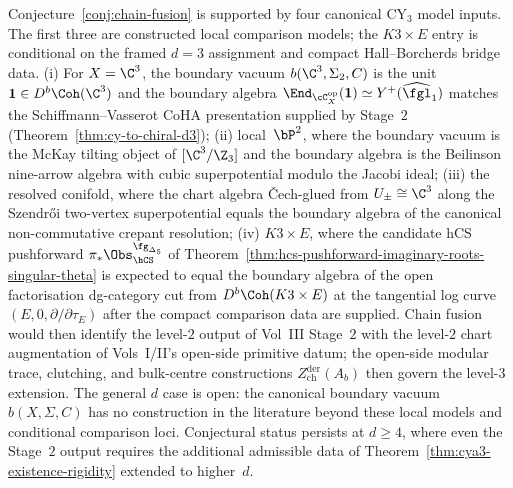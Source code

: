 \begin{remark}
\label{rem:chain-fusion-verified-cases}
Conjecture~\ref{conj:chain-fusion} is supported by four canonical
CY$_3$ model inputs.  The first three are constructed local comparison
models; the \(K3\times E\) entry is conditional on the framed
\(d=3\) assignment and compact Hall--Borcherds bridge data.
\textup{(i)} For $X = \C^3$, the boundary vacuum
$b(\C^3, \Sigma_2, C)$ is the unit
$\mathbf{1} \in D^b\Coh(\C^3)$ and the boundary algebra
$\End_{\cC_X^{\mathrm{op}}}(\mathbf{1}) \simeq Y^+(\widehat{\fgl}_1)$
matches the Schiffmann--Vasserot CoHA presentation supplied by Stage~$2$
\textup{(}Theorem~\ref{thm:cy-to-chiral-d3}\textup{);} \textup{(}ii\textup{)} local~$\bP^2$, where the
boundary vacuum is the McKay tilting object of $[\C^3 / \Z_3]$ and the
boundary algebra is the Beilinson nine-arrow algebra with cubic
superpotential modulo the Jacobi ideal; \textup{(}iii\textup{)} the resolved
conifold, where the chart algebra
\v{C}ech-glued from $U_\pm \cong \C^3$ along the Szendr\H{o}i
two-vertex superpotential equals the boundary algebra of the canonical
non-commutative crepant resolution; \textup{(}iv\textup{)} \(K3 \times E\), where the
candidate hCS pushforward
$\pi_* \Obs_{\hCS}^{\fg_{\Delta_5}}$ of
Theorem~\ref{thm:hcs-pushforward-imaginary-roots-singular-theta} is
expected to equal the boundary algebra of the open factorisation
dg-category cut from
$D^b\Coh(K3 \times E)$ at the tangential log curve
$(E, 0, \partial/\partial \tau_E)$ after the compact comparison data are
supplied.  Chain fusion would then identify the
level-$2$ output of Vol~III Stage~$2$ with the level-$2$ chart
augmentation of Vols~I/II's open-side primitive datum; the open-side
modular trace, clutching, and bulk-centre constructions
$Z^{\mathrm{der}}_{\mathrm{ch}}(A_b)$ then govern the level-$3$
extension. The general $d$ case is open: the canonical boundary vacuum
$b(X, \Sigma, C)$ has no construction in the literature beyond these
local models and conditional comparison loci. Conjectural status
persists at \(d \geq 4\), where
even the Stage~$2$ output requires the additional admissible
data of Theorem~\ref{thm:cya3-existence-rigidity} extended to higher~$d$.
\end{remark}

